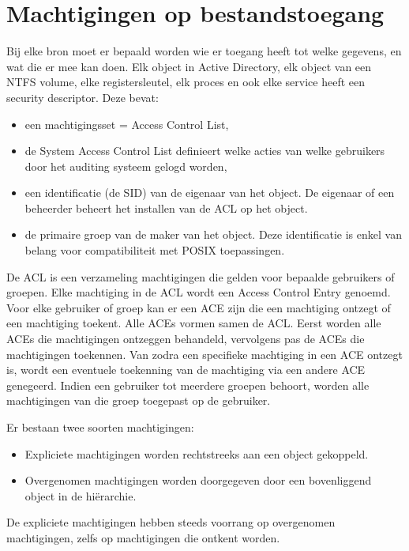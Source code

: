 	\section{Machtigingen op bestandstoegang }
	\begin{enumerate}
		 {
			Bij elke bron moet er bepaald worden wie er toegang heeft tot welke gegevens, en wat die er mee kan doen. Elk object in Active Directory, elk object van een NTFS volume, elke registersleutel, elk proces en ook elke service heeft een security descriptor. Deze bevat:
				\begin{itemize}
					\item een machtigingsset = Access Control List,
					\item de System Access Control List definieert welke acties van welke gebruikers door het auditing systeem gelogd worden,
					\item een identificatie (de SID) van de eigenaar van het object. De eigenaar of een beheerder beheert het installen van de ACL op het object.
					\item de primaire groep van de maker van het object. Deze identificatie is enkel van belang voor compatibiliteit met POSIX toepassingen.
				\end{itemize}
				De ACL is een verzameling machtigingen die gelden voor bepaalde gebruikers of groepen. Elke machtiging in de ACL wordt een Access Control Entry genoemd. Voor elke gebruiker of groep kan er een ACE zijn die een machtiging ontzegt of een machtiging toekent. Alle ACEs vormen samen de ACL. Eerst worden alle ACEs die machtigingen ontzeggen behandeld, vervolgens pas de ACEs die machtigingen toekennen. Van zodra een specifieke machtiging in een ACE ontzegt is, wordt een eventuele toekenning van de machtiging via een andere ACE genegeerd. Indien een gebruiker tot meerdere groepen behoort, worden alle machtigingen van die groep toegepast op de gebruiker. 

				Er bestaan twee soorten machtigingen:
				\begin{itemize}
					\item Expliciete machtigingen worden rechtstreeks aan een object gekoppeld.
					\item Overgenomen machtigingen worden doorgegeven door een bovenliggend object in de hiërarchie. 
				\end{itemize}
				De expliciete machtigingen hebben steeds voorrang op overgenomen machtigingen, zelfs op machtigingen die ontkent worden.

}
\end{enumerate}
